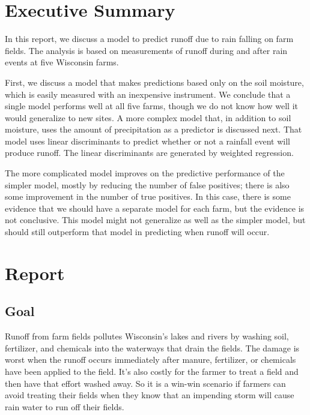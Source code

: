 \documentclass[11pt]{article}
\title{\report}
\author{Wesley Brooks}
\date{}                                           %
\begin{document}
\maketitle{}

\section{Executive Summary}
In this report, we discuss a model to predict runoff due to rain falling on farm fields. The analysis is based on measurements of runoff during and after rain events at five Wisconsin farms.\*

First, we discuss a model that makes predictions based only on the soil moisture, which is easily measured with an inexpensive instrument. We conclude that a single model performs well at all five farms, though we do not know how well it would generalize to new sites. A more complex model that,  in addition to soil moisture, uses the amount of precipitation as a predictor is discussed next. That model uses linear discriminants to predict whether or not a rainfall event will produce runoff. The linear discriminants are generated by weighted regression.\*

The more complicated model improves on the predictive performance of the simpler model, mostly by reducing the number of false positives; there is also some improvement in the number of true positives. In this case, there is some evidence that we should have a separate model for each farm, but the evidence is not conclusive. This model might not generalize as well as the simpler model, but should still outperform that model in predicting when runoff will occur.\*

\section{Report}

\subsection{Goal}
Runoff from farm fields pollutes Wisconsin's lakes and rivers by washing soil, fertilizer, and chemicals into the waterways that drain the fields. The damage is worst when the runoff occurs immediately after manure, fertilizer, or chemicals have been applied to the field. It's also costly for the farmer to treat a field and then have that effort washed away. So it is a win-win scenario if farmers can avoid treating their fields when they know that an impending storm will cause rain water to run off their fields. \*
\end{document}
